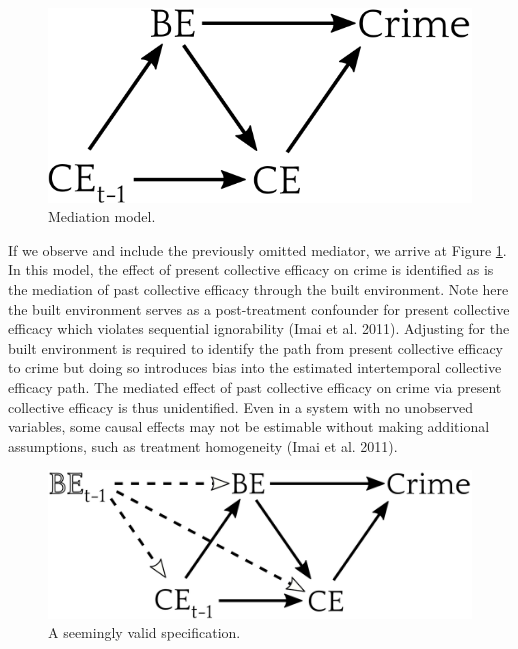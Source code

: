 \documentclass [11pt, proquest] {uwthesis}[2015/03/03]
\begin{document}
\linebreak
\begin{figure}

{\centering \includegraphics[width=0.5\linewidth]{./figure/appendix/4-5_be_model} 

}

\caption{Mediation model.}\label{fig:dag45}
\end{figure}
If we observe and include the previously omitted mediator, we arrive at Figure \ref{fig:dag45}. In this model, the effect of present collective efficacy on crime is identified as is the mediation of past collective efficacy through the built environment. Note here the built environment serves as a post-treatment confounder for present collective efficacy which violates sequential ignorability (Imai et al. 2011). Adjusting for the built environment is required to identify the path from present collective efficacy to crime but doing so introduces bias into the estimated intertemporal collective efficacy path. The mediated effect of past collective efficacy on crime via present collective efficacy is thus unidentified. Even in a system with no unobserved variables, some causal effects may not be estimable without making additional assumptions, such as treatment homogeneity (Imai et al. 2011).\linebreak
\linebreak
\begin{figure}

{\centering \includegraphics[width=0.6\linewidth]{./figure/appendix/5_blocked_path} 

}

\caption{A seemingly valid specification.}\label{fig:dag5}
\end{figure}
\end{document}

